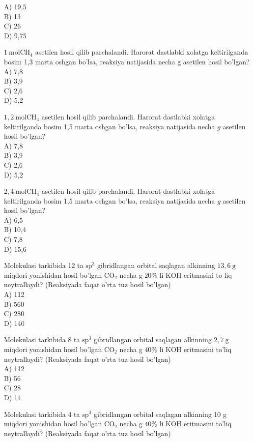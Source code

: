 A) 19,5\\
B) 13\\
C) 26\\
D) 9,75
  \item $1 \mathrm{~mol} \mathrm{CH}_{4}$ asetilen hosil qilib parchalandi. Harorat dastlabki xolatga keltirilganda bosim 1,3 marta oshgan bo'lsa, reaksiya natijasida necha g asetilen hosil bo'lgan?\\
A) 7,8\\
B) 3,9\\
C) 2,6\\
D) 5,2
  \item $1,2 \mathrm{~mol} \mathrm{CH}_{4}$ asetilen hosil qilib parchalandi. Harorat dastlabki xolatga keltirilganda bosim 1,5 marta oshgan bo'lsa, reaksiya natijasida necha $g$ asetilen hosil bo'lgan?\\
A) 7,8\\
B) 3,9\\
C) 2,6\\
D) 5,2
  \item $2,4 \mathrm{~mol} \mathrm{CH}_{4}$ asetilen hosil qilib parchalandi. Harorat dastlabki xolatga keltirilganda bosim 1,5 marta oshgan bo'lsa, reaksiya natijasida necha $g$ asetilen hosil bo'lgan?\\
A) 6,5\\
B) 10,4\\
C) 7,8\\
D) 15,6
  \item Molekulasi tarkibida 12 ta $\mathrm{sp}^{3}$ gibridlangan orbital saqlagan alkinning $13,6 \mathrm{~g}$ miqdori yonishidan hosil bo'lgan $\mathrm{CO}_{2}$ necha g $20 \%$ li KOH eritmasini to liq neytrallaydi? (Reaksiyada faqat o'rta tuz hosil bo'lgan)\\
A) 112\\
B) 560\\
C) 280\\
D) 140
  \item Molekulasi tarkibida 8 ta $\mathrm{sp}^{3}$ gibridlangan orbital saqlagan alkinning $2,7 \mathrm{~g}$ miqdori yonishidan hosil bo'lgan $\mathrm{CO}_{2}$ necha g $40 \%$ li KOH eritmasini to'liq neytrallaydi? (Reaksiyada faqat o'rta tuz hosil bo'lgan)\\
A) 112\\
B) 56\\
C) 28\\
D) 14
  \item Molekulasi tarkibida 4 ta $\mathrm{sp}^{3}$ gibridlangan orbital saqlagan alkinning 10 g miqdori yonishidan hosil bo'lgan $\mathrm{CO}_{2}$ necha g $40 \%$ li KOH eritmasini to'liq neytrallaydi? (Reaksiyada faqat o'rta tuz hosil bo'lgan)\\
